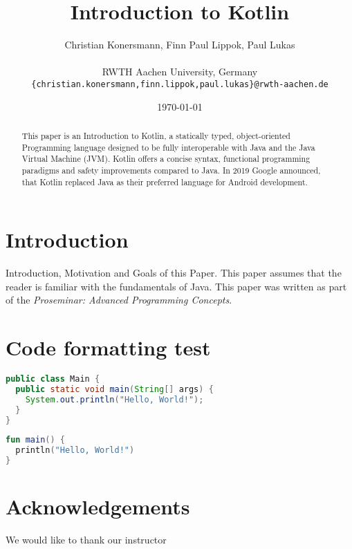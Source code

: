 \documentclass[a4paper, 11pt]{article}
\title{\huge \bfseries Introduction to Kotlin}
\author{
  Christian Konersmann, Finn Paul Lippok, Paul Lukas \\ 
  \\
  RWTH Aachen University, Germany \\
  \texttt{\{christian.konersmann,finn.lippok,paul.lukas\}@rwth-aachen.de}
}
\date{\today}
\begin{document}
\maketitle

\begin{abstract}
  This paper is an Introduction to Kotlin, a statically typed, object-oriented Programming language designed to be fully interoperable with Java and the Java Virtual Machine (JVM).
  Kotlin offers a concise syntax, functional programming paradigms and safety improvements compared to Java. In 2019 Google announced, that Kotlin replaced Java as their preferred language for Android development.
\end{abstract}

\section{Introduction}
  Introduction, Motivation and Goals of this Paper.
  This paper assumes that the reader is familiar with the fundamentals of Java.
  This paper was written as part of the \textit{Proseminar: Advanced Programming Concepts}.

\section{Code formatting test}
\renewcommand{\lstlistingname}{Java}
\begin{lstlisting}[language=Java,title={Hello World in Java}]
public class Main {
  public static void main(String[] args) {
    System.out.println("Hello, World!");
  }
}
\end{lstlisting}

\renewcommand{\lstlistingname}{Kotlin}
\begin{lstlisting}[language=Kotlin,title={Hello World in Kotlin}]
fun main() {
  println("Hello, World!")
}
\end{lstlisting}


\section*{Acknowledgements}
  We would like to thank our instructor
\end{document}
